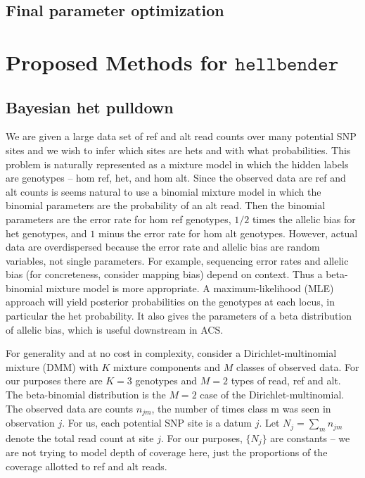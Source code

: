 \documentclass[nofootinbib,amssymb,amsmath]{revtex4}
\begin{document}
\subsection{Final parameter optimization} \label{final-parameter-optimization}

\section{Proposed Methods for $\texttt{hellbender}$} \label{proposed-methods-for-texttthellbender}

\subsection{Bayesian het pulldown} \label{bayesian-het-pulldown}

We are given a large data set of ref and alt read counts over many potential SNP sites and we wish to infer which sites are hets and with what probabilities.  This problem is naturally represented as a mixture model in which the hidden labels are genotypes -- hom ref, het, and hom alt.  Since the observed data are ref and alt counts is seems natural to use a binomial mixture model in which the binomial parameters are the probability of an alt read.  Then the binomial parameters are the error rate for hom ref genotypes, $1/2$ times the allelic bias for het genotypes, and $1$ minus the error rate for hom alt genotypes.  However, actual data are overdispersed because the error rate and allelic bias are random variables, not single parameters.  For example, sequencing error rates and allelic bias (for concreteness, consider mapping bias) depend on context.  Thus a beta-binomial mixture model is more appropriate.  A maximum-likelihood (MLE) approach will yield posterior probabilities on the genotypes at each locus, in particular the het probability.  It also gives the parameters of a beta distribution of allelic bias, which is useful downstream in ACS.

For generality and at no cost in complexity, consider a Dirichlet-multinomial mixture (DMM) with $K$ mixture components and $M$ classes of observed data.  For our purposes there are $K = 3$ genotypes and $M = 2$ types of read, ref and alt.  The beta-binomial distribution is the $M = 2$ case of the Dirichlet-multinomial.  The observed data are counts $n_{jm}$, the number of times class m was seen in observation $j$.  For us, each potential SNP site is a datum $j$.  Let $N_j = \sum_m n_{jm}$ denote the total read count at site $j$.  For our purposes, $\{ N_j \}$ are constants -- we are not trying to model depth of coverage here, just the proportions of the coverage allotted to ref and alt reads.
\end{document}
